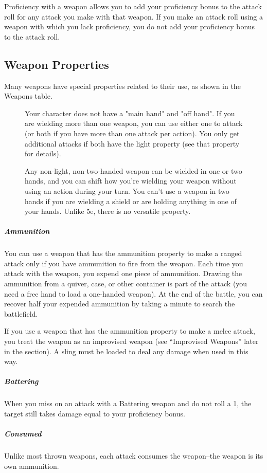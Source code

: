 Proficiency with a weapon allows you to add your proficiency bonus to the attack roll for any attack you make with that weapon. If you make an attack roll using a weapon with which you lack proficiency, you do not add your proficiency bonus to the attack roll.

\subsection{Weapon Properties}

Many weapons have special properties related to their use, as shown in the Weapons table.

\begin{figure}
\begin{DndComment}
	Your character does not have a "main hand" and "off hand". If you are wielding more than one weapon, you can use either one to attack (or both if you have more than one attack per action). You only get additional attacks if both have the light property (see that property for details).

	Any non-light, non-two-handed weapon can be wielded in one or two hands, and you can shift how you're wielding your weapon without using an action during your turn. You can't use a weapon in two hands if you are wielding a shield or are holding anything in one of your hands. Unlike 5e, there is no versatile property.
\end{DndComment}
\end{figure}

\subparagraph*{Ammunition} You can use a weapon that has the ammunition property to make a ranged attack only if you have ammunition to fire from the weapon. Each time you attack with the weapon, you expend one piece of ammunition. Drawing the ammunition from a quiver, case, or other container is part of the attack (you need a free hand to load a one-handed weapon). At the end of the battle, you can recover half your expended ammunition by taking a minute to search the battlefield.

If you use a weapon that has the ammunition property to make a melee attack, you treat the weapon as an improvised weapon (see “Improvised Weapons” later in the section). A sling must be loaded to deal any damage when used in this way.

\subparagraph*{Battering} When you miss on an attack with a Battering weapon and do not roll a 1, the target still takes damage equal to your proficiency bonus.

\subparagraph*{Consumed} Unlike most thrown weapons, each attack consumes the weapon--the weapon is its own ammunition.

